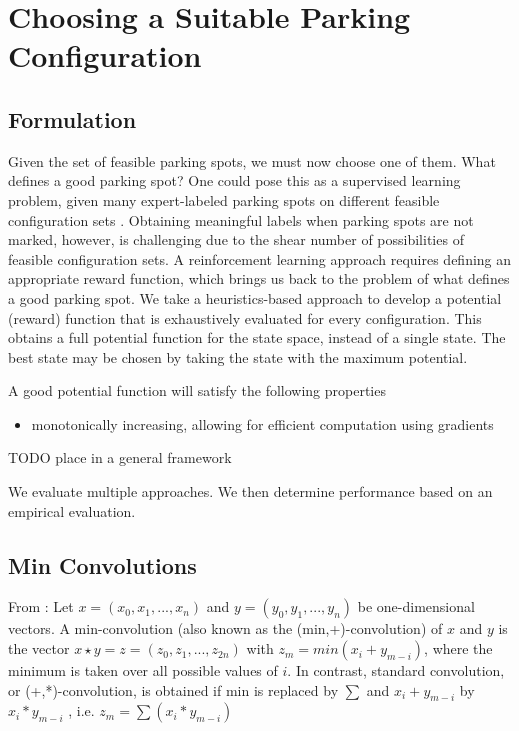\section{Choosing a Suitable Parking Configuration}
\label{sec:choosingparkingspot}
\subsection{Formulation}
Given the set of feasible parking spots, we must now choose one of them. What
defines a good parking spot? One could pose this as a supervised learning
problem, given many expert-labeled parking spots on different feasible
configuration sets \cite{wu2006parking, true2007vacant}. 
Obtaining meaningful labels when parking spots are not marked, however, is
challenging due to the shear number of possibilities of feasible configuration
sets. A reinforcement learning approach requires defining an appropriate reward
function, which brings us back to the problem of what defines a good parking
spot. We take a heuristics-based approach to develop a potential (reward)
function that is exhaustively evaluated for every configuration. This obtains a
full potential function for the state space, instead of a single state. The best
state may be chosen by taking the state with the maximum potential.

A good potential function will satisfy the following properties
\begin{itemize}
\item monotonically increasing, allowing for efficient computation
using gradients
\end{itemize}

TODO place in a general framework

We evaluate multiple approaches. We then determine performance based on an
empirical evaluation.

\subsection{Min Convolutions}
From \cite{burcsi2010table}:
Let $x = (x_0, x_1, ..., x_n)$ and $y = (y_0, y_1, ..., y_n)$ be one-dimensional
vectors.
A min-convolution (also known as the (min,+)-convolution) of $x$ and $y$ is the
vector $x \star y = z = (z_0, z_1, ...,z_{2n})$
with $z_m = min(x_i + y_{m-i})$, where the minimum is taken over all possible
values of $i$. 
In contrast, standard convolution, or (+,*)-convolution, is obtained if min is replaced by $\sum$ and
$x_i + y_{m-i}$ by $x_i * y_{m-i}$ , i.e. 
$z_m = \sum(x_i * y_{m-i})$

